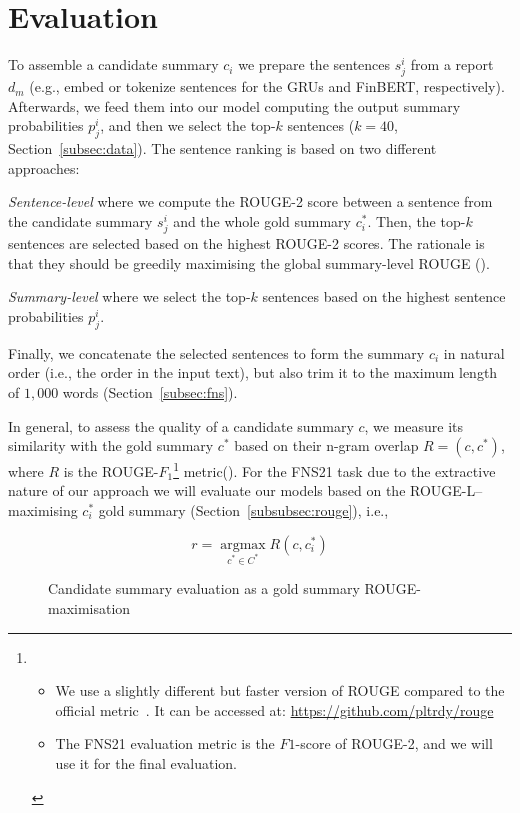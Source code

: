 \section{Evaluation}\label{sec:evaluation}

To assemble a candidate summary $c_{i}$ we prepare the sentences $s_{j}^{i}$ from a report $d_{m}$ (e.g., embed or tokenize sentences for the GRUs and FinBERT, respectively).
Afterwards, we feed them into our model computing the output summary probabilities $p_{j}^{i}$, and then we select the top-$k$ sentences ($k=40$, Section~\ref{subsec:data}).
The sentence ranking is based on two different approaches:
\begin{enumerate*}
    \item \emph{Sentence-level} where we compute the ROUGE-2 score between a sentence from the candidate summary $s_{j}^{i}$ and the whole gold summary $c^{*}_{i}$.
    Then, the top-$k$ sentences are selected based on the highest ROUGE-2 scores.
    The rationale is that they should be greedily maximising the global summary-level ROUGE (\cite{zmandar-etal-2021-joint}).
    \item \emph{Summary-level} where we select the top-$k$ sentences based on the highest sentence probabilities $p_{j}^{i}$.
\end{enumerate*}
Finally, we concatenate the selected sentences to form the summary $c_{i}$ in natural order (i.e., the order in the input text),
but also trim it to the maximum length of $1,000$ words (Section~\ref{subsec:fns}).

In general, to assess the quality of a candidate summary $c$, we measure its similarity with the gold summary $c^{*}$
based on their n-gram overlap $R=(c, c^{*})$, where $R$ is the ROUGE-$F_{1}$\footnote{
    \begin{itemize}
        \item We use a slightly different but faster version of ROUGE compared to the official metric~\cite{lin2004rouge}.
              It can be accessed at: \url{https://github.com/pltrdy/rouge}
        \item The FNS21 evaluation metric is the $F1$-score of ROUGE-2, and we will use it for the final evaluation.
    \end{itemize}
} metric(\cite{lin2004rouge}).
For the FNS21 task due to the extractive nature of our approach we will evaluate our models based on
the ROUGE-L--maximising $c^{*}_{i}$ gold summary (Section~\ref{subsubsec:rouge}), i.e.,

\begin{figure}[h]
    \centering
    \begin{equation}\label{eq:rouge_max}
        r = \underset{c^{*} \in C^{*}}{\operatorname{argmax}} R(c, c^{*}_{i})
    \end{equation}
    \caption{Candidate summary evaluation as a gold summary ROUGE-maximisation}
    \label{fig:rouge_max}
\end{figure}

